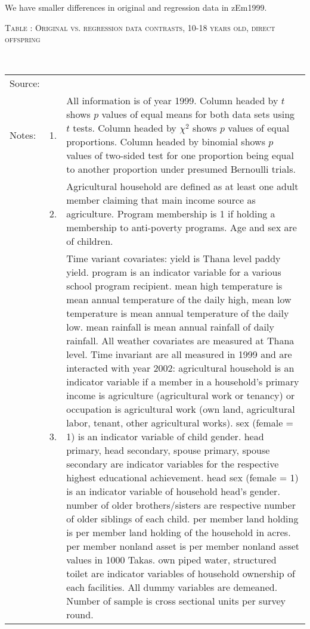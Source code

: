 We have smaller differences in original and regression data in \textsf{zEm1999}.

\hspace{-.5cm}\begin{minipage}[t]{14cm}
\hfil\textsc{\normalsize Table \thetable: Original vs. regression data contrasts, 10-18 years old,  direct offspring\label{tab origregcontrast2}}\\
\setlength{\tabcolsep}{1pt}
\renewcommand{\arraystretch}{.8}
\hfil{}\\
\renewcommand{\arraystretch}{.8}
\setlength{\tabcolsep}{1pt}
\begin{tabular}{>{\hfill\scriptsize}p{1cm}<{}>{\hfill\scriptsize}p{.25cm}<{}>{\scriptsize}p{12cm}<{\hfill}}
Source:& \multicolumn{2}{l}{\scriptsize Compiled from IFPRI data.}\\
Notes: & 1. & All information is of year 1999. Column headed by $t$ shows $p$ values of equal means for both data sets using $t$ tests. Column headed by $\chi^{2}$ shows $p$ values of equal proportions. Column headed by \textsf{binomial} shows $p$ values of two-sided test for one proportion being equal to another proportion under presumed Bernoulli trials. \\
& 2. & Agricultural household are defined as at least one adult member claiming that main income source as agriculture. Program membership is 1 if holding a membership to anti-poverty programs. Age and sex are of children.\\
& 3. & Time variant covariates: \textsf{yield} is Thana level paddy yield. \textsf{program} is an indicator variable for a various school program recipient. \textsf{mean high temperature} is mean annual temperature of the daily high, \textsf{mean low temperature} is mean annual temperature of the daily low. \textsf{mean rainfall} is mean annual rainfall of daily rainfall. All weather covariates are measured at Thana level. Time invariant are all measured in 1999 and are interacted with year 2002: \textsf{agricultural household} is an indicator variable if a member in a household's primary income is agriculture (agricultural work or tenancy) or occupation is agricultural work (own land, agricultural labor, tenant, other agricultural works). \textsf{sex (female = 1)} is an indicator variable of child gender. \textsf{head primary, head secondary, spouse primary, spouse secondary} are indicator variables for the respective highest educational achievement. \textsf{head sex (female = 1)} is an indicator variable of household head's gender. \textsf{number of older brothers/sisters} are respective number of older siblings of each child. \textsf{per member land holding} is per member land holding of the household in acres. \textsf{per member nonland asset} is per member nonland asset values in 1000 Takas. \textsf{own piped water, structured toilet} are indicator variables of household ownership of each facilities. All dummy variables are demeaned. Number of sample is cross sectional units per survey round. 

\end{tabular}
\end{minipage}
